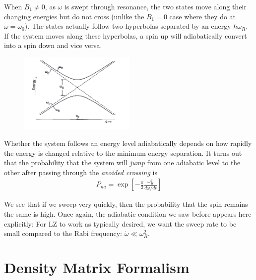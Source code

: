 \documentclass{book}
\theoremstyle{definition}
\newcommand{\f}[2]{\frac{#1}{#2}}
\newcommand{\lb}{\left[}
\newcommand{\rb}{\right]}
\begin{document}
When $B_1 \neq 0$, as $\omega$ is swept through resonance, the two states move along their changing energies but do not cross (unlike the $B_1 = 0$ case where they do at $\omega = \omega_0$). The states actually follow two hyperbolas separated by an energy $\hbar \omega_R$. If the system moves along these hyperbolas, a spin up will adiabatically convert into a spin down and vice versa. 


\begin{figure}[!htb]
	\centering
	\includegraphics[width=0.5\textwidth]{figures/LZ}
\end{figure}


Whether the system follows an energy level adiabatically depends on how rapidly the energy is changed relative to the minimum energy separation. It turns out that the probability that the system will \textit{jump} from one adiabatic level to the other after passing through the \textit{avoided crossing} is 
\begin{align*}
	\boxed{P_{na} = \exp\lb - \f{\pi}{2} \f{\omega_R^2}{ d\omega/dt} \rb}
\end{align*}

We see that if we sweep very quickly, then the probability that the spin remains the same is high. Once again, the adiabatic condition we saw before appears here explicitly: For LZ to work as typically desired, we want the sweep rate to be small compared to the Rabi frequency: $\dot \omega \ll \omega_R^2$.





\section{Density Matrix Formalism}
\end{document}
